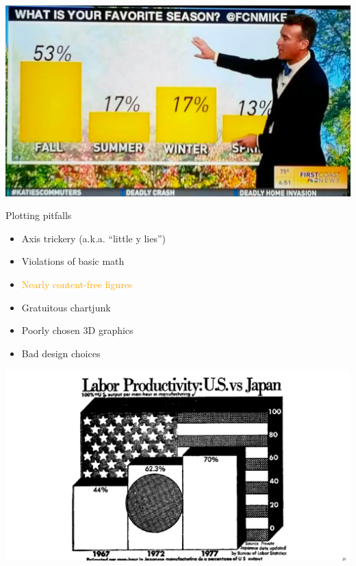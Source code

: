 \documentclass[
  ignorenonframetext,
]{beamer}
\providecommand{\tightlist}{%
  \setlength{\itemsep}{0pt}\setlength{\parskip}{0pt}}
\begin{document}
\begin{frame}{}
\protect\hypertarget{section-12}{}
\includegraphics{hallofshame_figs/fig_19.png}
\end{frame}

\begin{frame}{Plotting pitfalls}
\protect\hypertarget{plotting-pitfalls-2}{}
\begin{itemize}
\tightlist
\item
  Axis trickery (a.k.a. ``little y lies'')
\item
  Violations of basic math
\item
  \textcolor{orange}{Nearly content-free figures}
\item
  Gratuitous chartjunk
\item
  Poorly chosen 3D graphics
\item
  Bad design choices
\end{itemize}
\end{frame}

\begin{frame}{}
\protect\hypertarget{section-13}{}
\includegraphics{hallofshame_figs/fig_21.png}
\end{frame}
\end{document}
